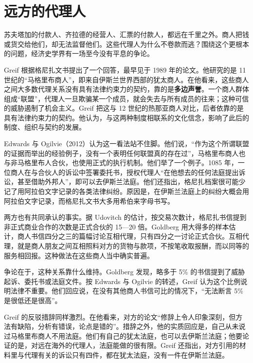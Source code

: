 \section{远方的代理人}\label{sec:islamic-agents}

苏夫塔加的付款人、齐拉德的经营人、汇票的付款人，都远在千里之外。商人把钱或货交给他们，却无法监督他们。这些代理人为什么不卷款而逃？围绕这个更根本的问题，经济史学界有一场至今没有平息的争论。

Greif 根据格尼扎文书提出了一个回答，最早见于 1989 年的论文\cite{greif1989}。他研究的是 11 世纪的“马格里布商人”，即来自伊斯兰世界西部的犹太商人。在他看来，这些商人之间大多数代理关系没有具有法律约束力的契约，靠的是\textbf{多边声誉}。一个商人群体组成“联盟”，代理人一旦欺骗某一个成员，就会失去与所有成员的往来；这种可信的威胁遏制了机会主义\cite{greif2012}。Greif 把这与 12 世纪的热那亚商人对比，后者依靠的是具有法律约束力的契约。他认为，与这两种制度相联系的文化信念，影响了此后的制度、组织与契约的发展。

Edwards 与 Ogilvie（2012）认为这一看法站不住脚。他们说，“作为这个所谓联盟的证据而举出的经验例子，没有一个表明任何联盟真的存在过”，马格里布商人也与非马格里布人合伙，也使用正式的执行机制\cite{edwards2012}。他们举了一个例子。1085 年，一位商人在与合伙人的诉讼中签署委托书，授权代理人“在他想去的任何法庭提出诉讼，甚至借助外邦人”，即可以去伊斯兰法庭。他们还指出，格尼扎档案很可能少记了用阿拉伯文字记录的各类法律纠纷。原因是，在伊斯兰法庭上的纠纷大概会用阿拉伯文字记录，而格尼扎文书大多用希伯来字母书写。

两方也有共同承认的事实。据 Udovitch 的估计，按交易次数计，格尼扎书信提到非正式商业合作的次数是正式合伙的 15—20 倍。Goldberg 用大得多的样本估计，商人书信四分之三的篇幅讨论互相代理，只有四分之一讨论正式合伙\cite{edwards2012}。互相代理，就是商人朋友之间互相照料对方的货物与款项，不按笔收取报酬，而以同等的服务相回报。这种做法在这些商人当中确实普遍。

争论在于，这种关系靠什么维持。Goldberg 发现，略多于 5\% 的书信提到了威胁起诉、委托书或法庭文件。按 Edwards 与 Ogilvie 的转述，Greif 认为这个比例说明法律不重要。他们回应说，在没有其他商人书信可比的情况下，“无法断言 5\% 是很低还是很高”\cite{edwards2012}。

Greif 的反驳措辞同样激烈。在他看来，对方的论文“修辞上令人印象深刻，但方法有缺陷，分析有错误，论点是错的”。措辞之外，他的实质回应是，自己从未说过马格里布商人不用法庭。他们有自己的犹太法庭，也可以去伊斯兰法庭；他要论证的是，对远在海外的代理人，法庭能做的很有限。Greif 还指出，对方引用的材料里与代理有关的诉讼只有四件，都在犹太法庭，没有一件在伊斯兰法庭\cite{greif2012}。

